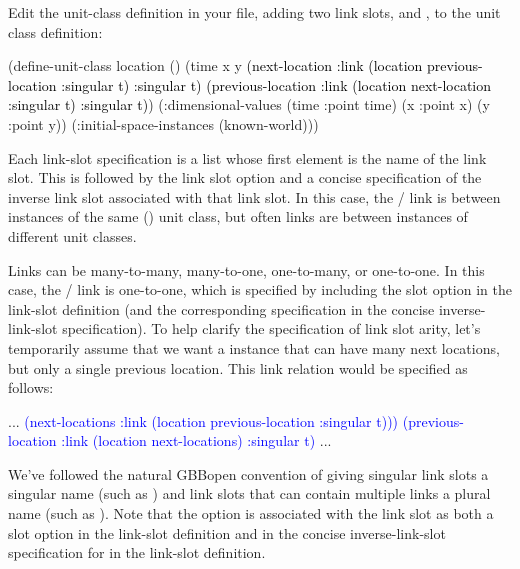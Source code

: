 \documentclass[10pt,twoside,english,pdftex]{article}
\begin{document}
Edit the  unit-class definition in your
 file, adding two link slots, 
and , to the  unit class definition:
%
\begin{example}\color{darkergray}%
  (define-unit-class location ()
    (time 
     x y
     \textcolor{black}{(next-location
      :link (location previous-location :singular t) 
      :singular t)
     (previous-location
      :link (location next-location :singular t)  
      :singular t)})
    (:dimensional-values
      (time :point time)
      (x :point x)
      (y :point y))
    (:initial-space-instances (known-world)))
\end{example}

Each link-slot specification is a list whose first element is the name of the
link slot.  This is followed by the link slot option  and a
concise specification of the inverse link slot associated with that link slot.
In this case, the / link is
between instances of the same () unit class, but often links
are between instances of different unit classes. 

Links can be many-to-many, many-to-one, one-to-many, or one-to-one.  In this
case, the / link is one-to-one,
which is specified by including the  slot option in the
link-slot definition (and the corresponding  specification
in the concise inverse-link-slot specification).  To help clarify the
specification of link slot arity, let's temporarily assume that we want a
 instance that can have many next locations, but only a single
previous location.  This link relation would be specified as follows:
%
\begin{example}\color{darkergray}%
      ...
   \textcolor{blue}{(next-locations
    :link (location previous-location :singular t)))
   (previous-location
    :link (location next-locations)  
    :singular t)}
      ...
\end{example}

We've followed the natural GBBopen convention of giving singular link
slots a singular name (such as ) and link
slots that can contain multiple links a plural name (such as
).  Note that the  option is
associated with the  link slot as both a slot
option in the  link-slot definition and in the
concise inverse-link-slot specification for 
in the  link-slot definition.
\end{document}
